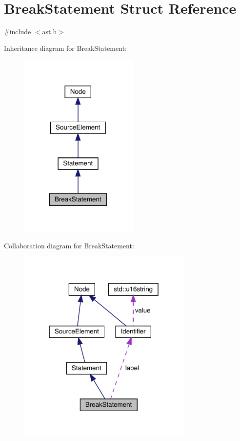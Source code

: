 \hypertarget{struct_break_statement}{}\section{Break\+Statement Struct Reference}
\label{struct_break_statement}


{\ttfamily \#include $<$ast.\+h$>$}



Inheritance diagram for Break\+Statement\+:\nopagebreak
\begin{figure}[H]
\begin{center}
\leavevmode
\includegraphics[width=168pt]{struct_break_statement__inherit__graph}
\end{center}
\end{figure}


Collaboration diagram for Break\+Statement\+:
\nopagebreak
\begin{figure}[H]
\begin{center}
\leavevmode
\includegraphics[width=247pt]{struct_break_statement__coll__graph}
\end{center}
\end{figure}
